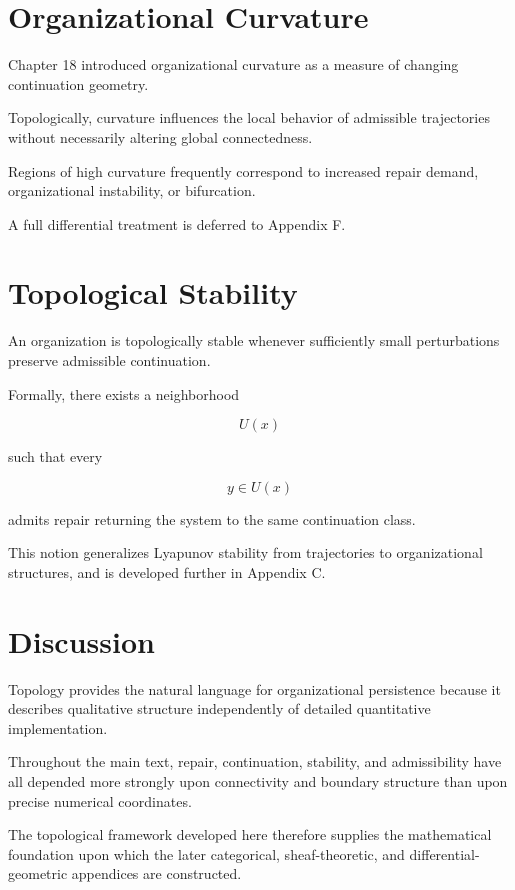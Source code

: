 \documentclass[11pt,oneside]{book}
\numberwithin{equation}{chapter}
\theoremstyle{definition}
\theoremstyle{plain}
\begin{document}
\section{Organizational Curvature}

Chapter 18 introduced organizational curvature as a measure of changing
continuation geometry.

Topologically, curvature influences the local behavior of admissible
trajectories without necessarily altering global connectedness.

Regions of high curvature frequently correspond to increased repair
demand, organizational instability, or bifurcation.

A full differential treatment is deferred to Appendix F.

\section{Topological Stability}

An organization is topologically stable whenever sufficiently small
perturbations preserve admissible continuation.

Formally, there exists a neighborhood

\[
U(x)
\]

such that every

\[
y
\in
U(x)
\]

admits repair returning the system to the same continuation class.

This notion generalizes Lyapunov stability from trajectories to
organizational structures, and is developed further in Appendix C.

\section{Discussion}

Topology provides the natural language for organizational persistence
because it describes qualitative structure independently of detailed
quantitative implementation.

Throughout the main text, repair, continuation, stability, and
admissibility have all depended more strongly upon connectivity and
boundary structure than upon precise numerical coordinates.

The topological framework developed here therefore supplies the
mathematical foundation upon which the later categorical, sheaf-theoretic,
and differential-geometric appendices are constructed.
\end{document}
